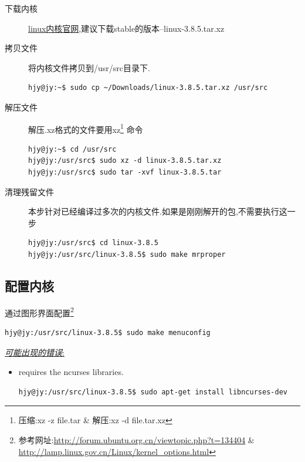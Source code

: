 \begin{description}
\item[下载内核]	\href{http://www.kernel.org}{linux内核官网},建议下载stable的版本--linux-3.8.5.tar.xz

\item[拷贝文件]	将内核文件拷贝到/usr/src目录下.
\begin{lstlisting}[style=BASH]
hjy@jy:~$ sudo cp ~/Downloads/linux-3.8.5.tar.xz /usr/src
\end{lstlisting}

\item[解压文件]	解压.xz格式的文件要用xz\footnote{压缩:xz -z file.tar \& 解压:xz -d file.tar.xz} 命令
\begin{lstlisting}[style=BASH]
hjy@jy:~$ cd /usr/src
hjy@jy:/usr/src$ sudo xz -d linux-3.8.5.tar.xz
hjy@jy:/usr/src$ sudo tar -xvf linux-3.8.5.tar
\end{lstlisting}

\item[清理残留文件]	本步针对已经编译过多次的内核文件.如果是刚刚解开的包,不需要执行这一步
\begin{lstlisting}[style=BASH]
hjy@jy:/usr/src$ cd linux-3.8.5
hjy@jy:/usr/src/linux-3.8.5$ sudo make mrproper
\end{lstlisting}
\end{description}


\subsection{配置内核}
通过图形界面配置\footnote{参考网址:\url{http://forum.ubuntu.org.cn/viewtopic.php?t=134404} \& \url{http://lamp.linux.gov.cn/Linux/kernel_options.html}}
\begin{lstlisting}[style=BASH]
hjy@jy:/usr/src/linux-3.8.5$ sudo make menuconfig
\end{lstlisting}

\underline{\textit{可能出现的错误}:}
\begin{itemize}
\item requires the ncurses libraries.
\begin{lstlisting}[style=BASH]
hjy@jy:/usr/src/linux-3.8.5$ sudo apt-get install libncurses-dev
\end{lstlisting}
\end{itemize}


